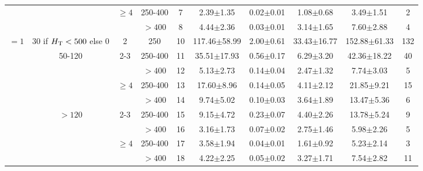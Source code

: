 \begin{table}
{\begin{minipage}{\textwidth}
\begin{tabular}{|c|c|c|c|c|c|c|c|c|c|}
                          &                         & \multirow{2}{*}{$\geq 4$} & 250-400 & 7  & 2.39$\pm$1.35     & 0.02$\pm$0.01 & 1.08$\pm$0.68    & 3.49$\pm$1.51     & 2       \\ \cline{4-5}  
                          &                         &                           & $>400$  & 8  & 4.44$\pm$2.36     & 0.03$\pm$0.01 & 3.14$\pm$1.65    & 7.60$\pm$2.88     & 4       \\ \hline       
\multirow{9}{*}{$=1$}     & 30 if $H_{\mathrm{T}}<500$ else 0  & 2                         & 250     & 10 & 117.46$\pm$58.99  & 2.00$\pm$0.61 & 33.43$\pm$16.77  & 152.88$\pm$61.33  & 132     \\ \cline{2-5}  
                          & \multirow{4}{*}{50-120} & \multirow{2}{*}{2-3}      & 250-400 & 11 & 35.51$\pm$17.93   & 0.56$\pm$0.17 & 6.29$\pm$3.20    & 42.36$\pm$18.22   & 40      \\ \cline{4-5}  
                          &                         &                           & $>400$  & 12 & 5.13$\pm$2.73     & 0.14$\pm$0.04 & 2.47$\pm$1.32    & 7.74$\pm$3.03     & 5       \\ \cline{3-5}  
                          &                         & \multirow{2}{*}{$\geq 4$} & 250-400 & 13 & 17.60$\pm$8.96    & 0.14$\pm$0.05 & 4.11$\pm$2.12    & 21.85$\pm$9.21    & 15      \\ \cline{4-5}  
                          &                         &                           & $>400$  & 14 & 9.74$\pm$5.02     & 0.10$\pm$0.03 & 3.64$\pm$1.89    & 13.47$\pm$5.36    & 6       \\ \cline{2-5}  
                          & \multirow{4}{*}{$>120$} & \multirow{2}{*}{2-3}      & 250-400 & 15 & 9.15$\pm$4.72     & 0.23$\pm$0.07 & 4.40$\pm$2.26    & 13.78$\pm$5.24    & 9       \\ \cline{4-5}  
                          &                         &                           & $>400$  & 16 & 3.16$\pm$1.73     & 0.07$\pm$0.02 & 2.75$\pm$1.46    & 5.98$\pm$2.26     & 5       \\ \cline{3-5}  
                          &                         & \multirow{2}{*}{$\geq 4$} & 250-400 & 17 & 3.58$\pm$1.94     & 0.04$\pm$0.01 & 1.61$\pm$0.92    & 5.23$\pm$2.14     & 3       \\ \cline{4-5}  
                          &                         &                           & $>400$  & 18 & 4.22$\pm$2.25     & 0.05$\pm$0.02 & 3.27$\pm$1.71    & 7.54$\pm$2.82     & 11      \\ \hline       

\end{tabular}
\end{minipage}}
\end{table}
